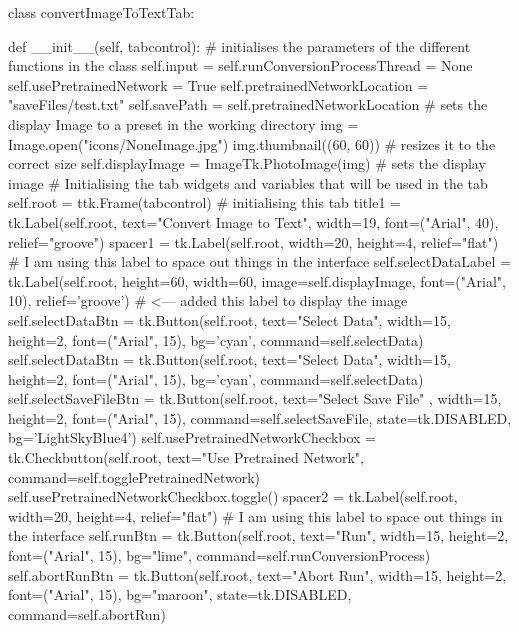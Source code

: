 \documentclass{report}
\begin{document}
\begin{python}
class convertImageToTextTab:

    def __init__(self, tabcontrol):
        # initialises the parameters of the different functions in the class
        self.input = self.runConversionProcessThread = None
        self.usePretrainedNetwork = True
        self.pretrainedNetworkLocation = "saveFiles/test.txt"
        self.savePath = self.pretrainedNetworkLocation
        # sets the display Image to a preset in the working directory
        img = Image.open("icons/NoneImage.jpg")
        img.thumbnail((60, 60))  # resizes it to the correct size
        self.displayImage = ImageTk.PhotoImage(img)  # sets the display image
        # Initialising the tab widgets and variables that will be used in the tab
        self.root = ttk.Frame(tabcontrol)  # initialising this tab
        title1 = tk.Label(self.root, text="Convert Image to Text", width=19,
                            font=("Arial", 40), relief="groove")
        spacer1 = tk.Label(self.root, width=20, height=4,
                            relief="flat")  # I am using this label to space out things in the interface
        self.selectDataLabel = tk.Label(self.root, height=60, width=60,
                            image=self.displayImage, font=("Arial", 10),
                            relief='groove')  # <--- added this label to display the image
        self.selectDataBtn = tk.Button(self.root, text="Select Data",
                            width=15, height=2, font=("Arial", 15),
                            bg='cyan', command=self.selectData)
        self.selectDataBtn = tk.Button(self.root, text="Select Data",
                            width=15, height=2, font=("Arial", 15),
                            bg='cyan', command=self.selectData)
        self.selectSaveFileBtn = tk.Button(self.root, text="Select Save File"
                                , width=15, height=2, font=("Arial", 15),
                                command=self.selectSaveFile, state=tk.DISABLED,
                                bg='LightSkyBlue4')
        self.usePretrainedNetworkCheckbox = tk.Checkbutton(self.root,
                                text="Use Pretrained Network",
                                command=self.togglePretrainedNetwork)
        self.usePretrainedNetworkCheckbox.toggle()
        spacer2 = tk.Label(self.root, width=20, height=4,
                           relief="flat")  # I am using this label to space out things in the interface
        self.runBtn = tk.Button(self.root, text="Run", width=15, height=2,
                                font=("Arial", 15), bg="lime",
                                command=self.runConversionProcess)
        self.abortRunBtn = tk.Button(self.root, text="Abort Run", width=15,
                                height=2, font=("Arial", 15),
                                bg="maroon", state=tk.DISABLED,
                                command=self.abortRun)


\end{python}
\end{document}
